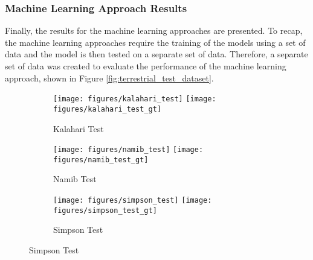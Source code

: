 \subsubsection*{Machine Learning Approach Results}

Finally, the results for the machine learning approaches are presented. To recap, the machine learning approaches require the training of the models using a set of data and the model is then tested on a separate set of data. Therefore, a separate set of data was created to evaluate the performance of the machine learning approach, shown in Figure \ref{fig:terrestrial_test_dataset}.

\begin{figure}
	\centering
	\begin{subfigure}{\textwidth}
		\centering
		\texttt{[image: figures/kalahari\_test]}
		\texttt{[image: figures/kalahari\_test\_gt]}
		\caption{ Kalahari Test }
		\label{fig:kalahari_test_image}
	\end{subfigure}
	\begin{subfigure}{\textwidth}
		\centering
		\texttt{[image: figures/namib\_test]}
		\texttt{[image: figures/namib\_test\_gt]}
		\caption{ Namib Test }
		\label{fig:namib_test_image}
	\end{subfigure}
	\begin{subfigure}{\textwidth}
		\centering
		\texttt{[image: figures/simpson\_test]}
		\texttt{[image: figures/simpson\_test\_gt]}
		\caption{ Simpson Test }
		\label{fig:simpson_test_image}
	\end{subfigure}
\end{figure}
